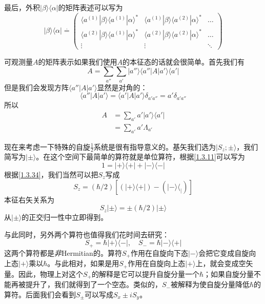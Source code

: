 \documentclass[UTF8,twoside]{ctexart}
\def\be{\begin{equation}}
\def\ee{\end{equation}}
\begin{document}
\noindent 最后，外积$|\beta\rangle\langle\alpha|$的矩阵表述可以写为
\be
|\beta\rangle\langle\alpha|\overset{\cdot}{=}\left(\begin{matrix}
\langle a^{(1)}|\beta\rangle\langle a^{(1)}|\alpha\rangle^* & \langle a^{(1)}|\beta\rangle\langle a^{(2)}|\alpha\rangle^* & \ldots\\
\langle a^{(2)}|\beta\rangle\langle a^{(1)}|\alpha\rangle^* & \langle a^{(2)}|\beta\rangle\langle a^{(2)}|\alpha\rangle^* & \ldots\\
\vdots & \vdots & \ddots
\end{matrix}\right)
\ee

可观测量$A$的矩阵表示如果我们使用$A$的本征态的话就会很简单。首先我们有
\be
A = \sum_{a''}\sum_{a'}|a''\rangle\langle a''|A|a'\rangle\langle a'|
\ee
但是我们会发现方阵$\langle a''|A|a'\rangle$显然是对角的：
\be
\langle a''|A|a'\rangle = \langle a'|A|a'\rangle\delta_{a'a''} = a'\delta_{a'a''}
\ee
所以
\be\label{1.3.34}\begin{split}
A&=\sum_{a'}a'|a'\rangle\langle a'|\\
&=\sum_{a'}a'\Lambda_{a'}
\end{split}\ee


现在来考虑一下特殊的自旋$\frac{1}{2}$系统是很有指导意义的。基矢我们选为$|S_z;\pm\rangle$，我们简写为$|\pm\rangle$。在这个空间下最简单的算符就是单位算符，根据\eqref{1.3.11}可以写为
\be
1 = |+\rangle\langle+|+|-\rangle\langle-|
\ee
根据\eqref{1.3.34}，我们当然可以把$S_z$写成
\be
S_z = (\hbar/2)[(|+\rangle\langle+|)-(|-\rangle\langle_|)]
\ee
本征右矢关系为
\be
S_z|\pm\rangle = \pm(\hbar/2)|\pm\rangle
\ee
从$|\pm\rangle$的正交归一性中立即得到。

与此同时，另外两个算符也值得我们花时间去研究：
\be
S_+ = \hbar|+\rangle\langle-|,\quad S_- = \hbar|-\rangle\langle+|
\ee
这两个算符都是{\it 非}Hermitian的。算符$S_+$作用在自旋向下态$|-\rangle$会把它变成自旋向上态$|+\rangle$乘以$\hbar$。与此相对，如果是用$S_+$作用在自旋向上态$|+\rangle$上，就会变成空矢量。因此，物理上对这个$S_+$的解释是它可以提升自旋分量一个$\hbar$；如果自旋分量不能再被提升了，我们就得到了一个空态。类似的，$S_-$被解释为使自旋分量降低$\hbar$的算符。后面我们会看到$S_\pm$可以写成$S_x\pm iS_y$。
\end{document}
